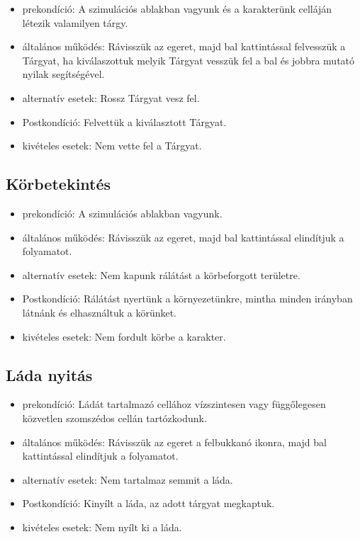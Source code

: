 \begin{itemize}
    \item prekondíció: A szimulációs ablakban vagyunk és a karakterünk celláján létezik valamilyen tárgy.
    \item általános működés: Rávisszük az egeret, majd bal kattintással felvesszük a Tárgyat, ha kiválaszottuk melyik Tárgyat vesszük fel a bal és jobbra mutató nyilak segítségével.
    \item alternatív esetek: Rossz Tárgyat vesz fel.
    \item Postkondíció: Felvettük a kiválasztott Tárgyat.
    \item kivételes esetek: Nem vette fel a Tárgyat.
\end{itemize}

\subsection{Körbetekintés}

\begin{itemize}
    \item prekondíció: A szimulációs ablakban vagyunk.
    \item általános működés: Rávisszük az egeret, majd bal kattintással elindítjuk a folyamatot.
    \item alternatív esetek: Nem kapunk rálátást a körbeforgott területre.
    \item Postkondíció: Rálátást nyertünk a környezetünkre, mintha minden irányban látnánk és elhasználtuk a körünket.
    \item kivételes esetek: Nem fordult körbe a karakter.
\end{itemize}

\subsection{Láda nyitás}

\begin{itemize}
    \item prekondíció: Ládát tartalmazó cellához vízszintesen vagy függőlegesen közvetlen szomszédos cellán tartózkodunk.
    \item általános működés: Rávisszük az egeret a felbukkanó ikonra, majd bal kattintással elindítjuk a folyamatot.
    \item alternatív esetek: Nem tartalmaz semmit a láda.
    \item Postkondíció: Kinyílt a láda, az adott tárgyat megkaptuk.
    \item kivételes esetek: Nem nyílt ki a láda.
\end{itemize}

